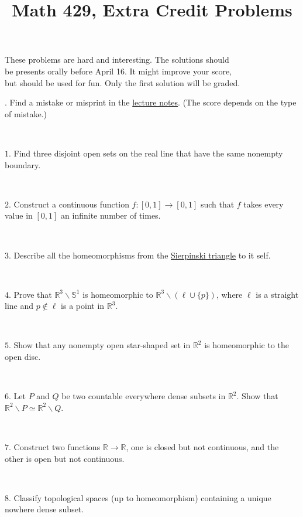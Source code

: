 \documentclass{article}
\def\noi{\noindent}%
\def\RR{\mathbb{R}}%
\def\:{\colon}
\begin{document}
\title{Math 429, Extra Credit Problems}
\author{}
\date{}
\maketitle

\begin{center}
{\small These problems are hard and interesting.
The solutions should \\
be presents orally before April 16.
It might improve your score,\\
but should be used for fun. Only the first solution will be graded.}
\end{center}
\thispagestyle{empty}


\noi 0. Find a mistake or misprint in the \href{https://anton-petrunin.github.io/topology/book.pdf}{lecture notes}.
(The score depends on the type of mistake.)

\ 

\noi $1$. 
Find three disjoint open sets on the real line 
that have the same nonempty boundary. 

\ 

\noi $2$. Construct a continuous function 
$f\:[0,1]\rightarrow [0,1]$ such that $f$ takes every value in $[0,1]$ 
an infinite number of times.

\ 

\noi $3$.
Describe all the homeomorphisms from the \href{http://en.wikipedia.org/wiki/Sierpinski_triangle}{Sierpinski triangle} to it self.

\ 

\noi $4$. Prove that $\RR^3\backslash \mathbb{S}^1$ is homeomorphic to $\RR^3\backslash (\ell\cup \{p\})$, where $\ell$ is a straight line and $p\not\in\ell$ is a point in $\RR^3$.


\ 


\noi $5$. Show that any nonempty open star-shaped set in $\RR^2$ is homeomorphic to the open disc.

\ 

\noi $6$. Let $P$ and $Q$ be two countable everywhere dense subsets in $\RR^2$.
Show that $\RR^2\backslash P\simeq\RR^2\backslash Q$.

\ 

\noi $7.$
Construct two functions $\RR\to\RR$, one is closed but not continuous, and the other is open but not continuous.


\ 

\noi $8.$
Classify topological spaces (up to homeomorphism) containing a unique nowhere dense subset.
\end{document}
